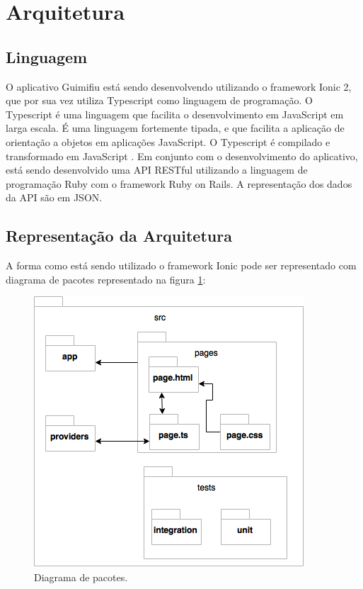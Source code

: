 \section{Arquitetura}

\subsection{Linguagem}

O aplicativo Guimifiu está sendo desenvolvendo utilizando o framework Ionic 2, que por sua vez utiliza Typescript como linguagem de programação. O Typescript é uma linguagem que facilita o desenvolvimento em JavaScript em larga escala. É uma linguagem fortemente tipada, e que facilita a aplicação de orientação a objetos em aplicações JavaScript. O Typescript é compilado e transformado em JavaScript \cite{typescript}.
Em conjunto com o desenvolvimento do aplicativo, está sendo desenvolvido uma API RESTful utilizando a linguagem de programação Ruby com o framework Ruby on Rails. A representação dos dados da API são em JSON.


\subsection{Representação da Arquitetura}

A forma como está sendo utilizado o framework Ionic pode ser representado com diagrama de pacotes representado na figura \ref{img:pacotes}:

\begin{figure}[H]
    \centering
    \includegraphics[scale=0.5]{figuras/ionic_arch.png}
    \caption[Diagrama de pacotes do aplicativo]{Diagrama de pacotes.}
    \label{img:pacotes}
\end{figure}

